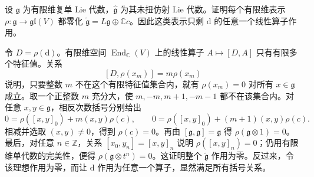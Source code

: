 \begin{exercise}\label{b5:ex:G-finite-affine-representations}
	设 \(\mathfrak g\) 为有限维复单 Lie 代数，\(\widehat{\mathfrak g}\) 为其未扭仿射 Lie 代数。证明每个有限维表示 \(\rho:\widehat{\mathfrak g}\rightarrow\mathfrak{gl}(V)\) 都零化 \(\widetilde{\mathfrak g}=L\mathfrak g\oplus\mathbb Cc\)。因此这类表示只剩 \(\mathrm d\) 的任意一个线性算子作用。
\end{exercise}
\begin{solution}
	令 \(D=\rho(\mathrm d)\)。有限维空间 \(\operatorname{End}_{\mathbb C}(V)\) 上的线性算子 \(A\mapsto[D,A]\) 只有有限多个特征值。关系
	\[
		[D,\rho(x_m)]=m\rho(x_m)
	\]
	说明，只要整数 \(m\) 不在这个有限特征值集合内，就有 \(\rho(x_m)=0\) 对所有 \(x\in\mathfrak g\) 成立。取一个正整数 \(m\) 充分大，使 \(m,-m,m+1,-m-1\) 都不在该集合内。对任意 \(x,y\in\mathfrak g\)，相反次数括号分别给出
	\[
		0=\rho([x,y]_0)+m(x,y)\rho(c),\qquad
		0=\rho([x,y]_0)+(m+1)(x,y)\rho(c).
	\]
	相减并选取 \((x,y)\ne0\)，得到 \(\rho(c)=0\)。再由 \([\mathfrak g,\mathfrak g]=\mathfrak g\) 得 \(\rho(\mathfrak g\otimes1)=0\)。最后，对任意 \(n\in\mathbb Z\)，关系 \([x_0,y_n]=[x,y]_n\) 说明 \(\rho([x,y]_n)=0\)；仍用有限维单代数的完美性，便得 \(\rho(\mathfrak g\otimes t^n)=0\)。这证明整个 \(\widetilde{\mathfrak g}\) 作用为零。反过来，令该理想作用为零，而让 \(\mathrm d\) 作用为任意一个算子，显然满足所有括号关系。
\end{solution}




